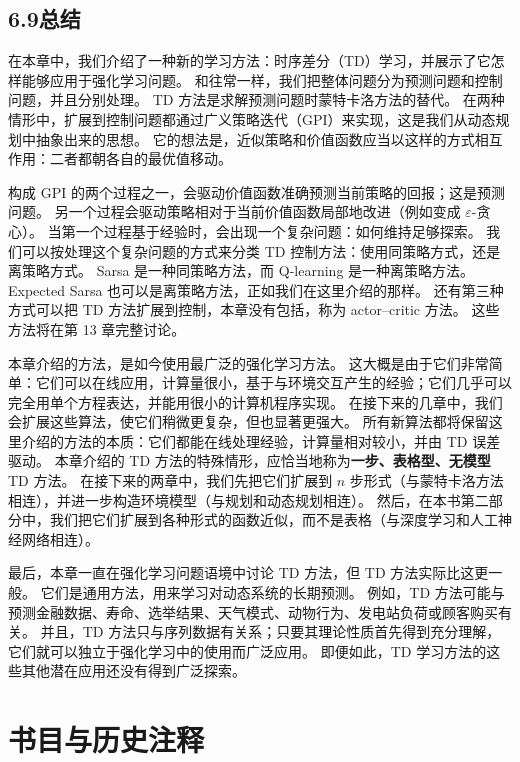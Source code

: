 \documentclass[UTF8,12pt,a4paper,fontset=fandol]{ctexart}
\begin{document}
\subsection*{6.9\quad 总结}

在本章中，我们介绍了一种新的学习方法：时序差分（TD）学习，并展示了它怎样能够应用于强化学习问题。
和往常一样，我们把整体问题分为预测问题和控制问题，并且分别处理。
TD 方法是求解预测问题时蒙特卡洛方法的替代。
在两种情形中，扩展到控制问题都通过广义策略迭代（GPI）来实现，这是我们从动态规划中抽象出来的思想。
它的想法是，近似策略和价值函数应当以这样的方式相互作用：二者都朝各自的最优值移动。

构成 GPI 的两个过程之一，会驱动价值函数准确预测当前策略的回报；这是预测问题。
另一个过程会驱动策略相对于当前价值函数局部地改进（例如变成 $\varepsilon$-贪心）。
当第一个过程基于经验时，会出现一个复杂问题：如何维持足够探索。
我们可以按处理这个复杂问题的方式来分类 TD 控制方法：使用同策略方式，还是离策略方式。
Sarsa 是一种同策略方法，而 Q-learning 是一种离策略方法。
Expected Sarsa 也可以是离策略方法，正如我们在这里介绍的那样。
还有第三种方式可以把 TD 方法扩展到控制，本章没有包括，称为 actor--critic 方法。
这些方法将在第 13 章完整讨论。

本章介绍的方法，是如今使用最广泛的强化学习方法。
这大概是由于它们非常简单：它们可以在线应用，计算量很小，基于与环境交互产生的经验；它们几乎可以完全用单个方程表达，并能用很小的计算机程序实现。
在接下来的几章中，我们会扩展这些算法，使它们稍微更复杂，但也显著更强大。
所有新算法都将保留这里介绍的方法的本质：它们都能在线处理经验，计算量相对较小，并由 TD 误差驱动。
本章介绍的 TD 方法的特殊情形，应恰当地称为\textbf{一步、表格型、无模型} TD 方法。
在接下来的两章中，我们先把它们扩展到 $n$ 步形式（与蒙特卡洛方法相连），并进一步构造环境模型（与规划和动态规划相连）。
然后，在本书第二部分中，我们把它们扩展到各种形式的函数近似，而不是表格（与深度学习和人工神经网络相连）。

最后，本章一直在强化学习问题语境中讨论 TD 方法，但 TD 方法实际比这更一般。
它们是通用方法，用来学习对动态系统的长期预测。
例如，TD 方法可能与预测金融数据、寿命、选举结果、天气模式、动物行为、发电站负荷或顾客购买有关。
并且，TD 方法只与序列数据有关系；只要其理论性质首先得到充分理解，它们就可以独立于强化学习中的使用而广泛应用。
即便如此，TD 学习方法的这些其他潜在应用还没有得到广泛探索。

\section*{书目与历史注释}
\end{document}
